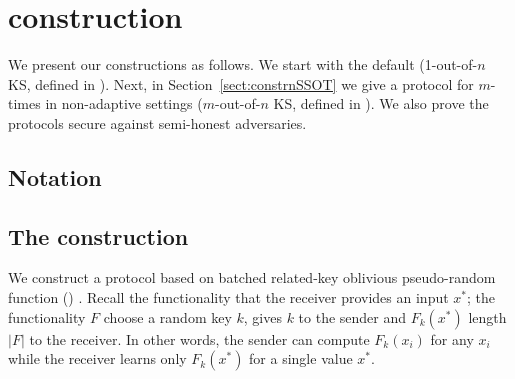 
\section{\SSOT construction}

We present our constructions as follows.  We start with the default \SSOT  (1-out-of-$n$ KS, defined in ).  Next, in Section~\ref{sect:constrnSSOT} we give a protocol for $m$-times  \SSOT  in non-adaptive settings ($m$-out-of-$n$ KS, defined in ). We also prove the protocols secure against semi-honest adversaries.
 

\subsection{Notation}
\subsection{The \SSOT construction}
\label{sect:constr1SSOT}

We construct a \SSOT protocol based on batched related-key oblivious pseudo-random function (\batchOPRF) \cite{CCS:KKRT16}. Recall the  \batchOPRF functionality that the receiver provides an input $x^*$; the functionality $F$ choose a random key $k$, gives $k$ to the sender and $F_k(x^*)$ length $|F|$ to the receiver. In other words, the sender can compute $F_k(x_i)$ for any $x_i$ while the receiver learns only $F_k(x^*)$ for a single value $x^*$. 

